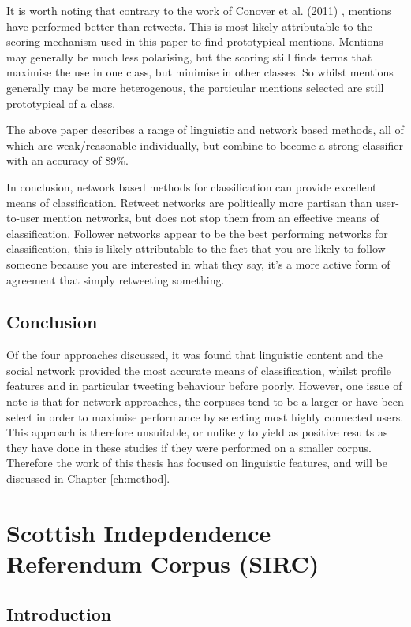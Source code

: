 \documentclass[bsc,frontabs,singlespacing,parskip]{infthesis}     %
\begin{document}
 It is worth noting that contrary to the work of Conover et al. (2011) \cite{politicalpolarisation}, mentions  have performed better than retweets. This is most likely attributable to the scoring mechanism used in this paper to find prototypical mentions. Mentions may generally be much less polarising, but the scoring still finds terms that maximise the use in one class, but minimise in other classes. So whilst mentions generally may be more heterogenous, the particular mentions selected are still prototypical of a class.

The above paper describes a range of linguistic and network based methods, all of which are weak/reasonable individually, but combine to become a strong classifier with an accuracy of 89\%. 

In conclusion, network based methods for classification can provide excellent means of classification. Retweet networks are politically more partisan than user-to-user mention networks, but does not stop them from an effective means of classification. Follower networks appear to be the best performing networks for classification, this is likely attributable to the fact that you are likely to follow someone because you are interested in what they say, it's a more active form of agreement that simply retweeting something.

\section{Conclusion}

Of the four approaches discussed, it was found that linguistic content and the social network provided the most accurate means of classification, whilst profile features and in particular tweeting behaviour before poorly. However, one issue of note is that for network approaches, the corpuses tend to be a larger or have been select in order to maximise performance by selecting most highly connected users. This approach is therefore unsuitable, or unlikely to yield as positive results as they have done in these studies if they were performed on a smaller corpus. Therefore the work of this thesis has focused on linguistic features, and will be discussed in Chapter \ref{ch:method}.

\chapter{Scottish Indepdendence Referendum Corpus (SIRC)}
\label{ch:corpus}
\section{Introduction}
\end{document}
